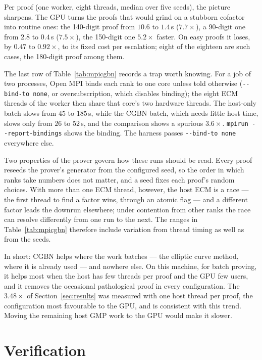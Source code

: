 \documentclass[11pt,a4paper]{article}
\newcommand{\code}[1]{\texttt{#1}}
\begin{document}
Per proof (one worker, eight threads, median over five seeds), the picture sharpens. The GPU
turns the proofs that would grind on a stubborn cofactor into routine ones: the 140-digit proof
from $10.6$ to $1.4$\,s ($7.7\times$), a 90-digit one from $2.8$ to $0.4$\,s ($7.5\times$), the
150-digit one $5.2\times$ faster. On easy proofs it loses, by $0.47$ to $0.92\times$, to its
fixed cost per escalation; eight of the eighteen are such cases, the 180-digit proof among them.

The last row of Table~\ref{tab:mpicgbn} records a trap worth knowing. For a job of two
processes, Open MPI binds each rank to one core unless told otherwise (\code{-{}-bind-to none},
or oversubscription, which disables binding); the eight ECM threads of the worker then share
that core's two hardware threads. The host-only batch slows from $45$ to $185$\,s, while the
CGBN batch, which needs little host time, slows only from $26$ to $52$\,s, and the comparison
shows a spurious $3.6\times$. \code{mpirun -{}-report-bindings} shows the binding. The harness
passes \code{-{}-bind-to none} everywhere else.

Two properties of the prover govern how these runs should be read. Every proof reseeds the
prover's generator from the configured seed, so the order in which ranks take numbers does not
matter, and a seed fixes each proof's random choices. With more than one ECM thread, however,
the host ECM is a race --- the first thread to find a factor wins, through an atomic flag --- and
a different factor leads the downrun elsewhere; under contention from other ranks the race can
resolve differently from one run to the next. The ranges in Table~\ref{tab:mpicgbn} therefore
include variation from thread timing as well as from the seeds.

In short: CGBN helps where the work batches --- the elliptic curve method, where it is already
used --- and nowhere else. On this machine, for batch proving, it helps most when the host has
few threads per proof and the GPU few users, and it removes the occasional pathological proof in
every configuration. The $3.48\times$ of Section~\ref{sec:results} was measured with one host
thread per proof, the configuration most favourable to the GPU, and is consistent with this
trend. Moving the remaining host GMP work to the GPU would make it slower.

\section{Verification}
\label{sec:verify}
\end{document}
